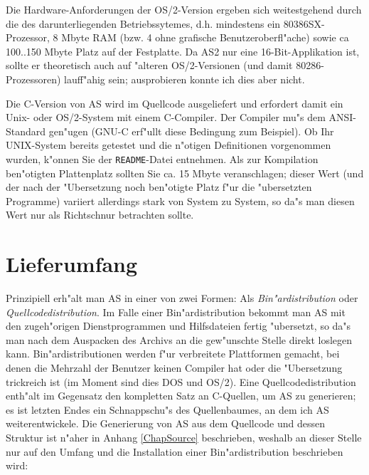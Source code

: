 \documentclass[12pt,a4paper,twoside]{report}
\newcommand{\tty}[1]{{\tt #1}}
\begin{document}
Die Hardware-Anforderungen der  OS/2-Version ergeben sich
weitestgehend durch die des darunterliegenden Betriebssytemes, d.h.
mindestens ein 80386SX-Prozessor, 8 Mbyte RAM (bzw. 4 ohne grafische
Benutzeroberfl"ache) sowie ca 100..150 Mbyte Platz auf der Festplatte.  Da
AS2 nur eine 16-Bit-Applikation ist, sollte er theoretisch auch auf
"alteren OS/2-Versionen (und damit 80286-Prozessoren) lauff"ahig sein;
ausprobieren konnte ich dies aber nicht.

Die C-Version  von AS wird im Quellcode ausgeliefert
und erfordert damit ein Unix- oder OS/2-System mit einem C-Compiler.
Der Compiler mu"s dem ANSI-Standard gen"ugen (GNU-C erf"ullt diese
Bedingung zum Beispiel).  Ob Ihr UNIX-System bereits getestet und die
n"otigen Definitionen vorgenommen wurden, k"onnen Sie der \tty{README}-Datei
entnehmen.  Als zur Kompilation ben"otigten Plattenplatz sollten Sie
ca. 15 Mbyte veranschlagen; dieser Wert (und der nach der "Ubersetzung
noch ben"otigte Platz f"ur die "ubersetzten Programme) variiert
allerdings stark von System zu System, so da"s man diesen Wert nur als
Richtschnur betrachten sollte.


\section{Lieferumfang}

Prinzipiell erh"alt man AS in einer von zwei Formen: Als {\em
Bin"ardistribution} oder {\em Quellcodedistribution}.  Im Falle einer
Bin"ardistribution bekommt man AS mit den zugeh"origen Dienstprogrammen
und Hilfsdateien fertig "ubersetzt, so da"s man nach dem Auspacken des
Archivs an die gew"unschte Stelle direkt loslegen kann.
Bin"ardistributionen werden f"ur verbreitete Plattformen gemacht, bei
denen die Mehrzahl der Benutzer keinen Compiler hat oder die "Ubersetzung
trickreich ist (im Moment sind dies DOS und OS/2).  Eine
Quellcodedistribution enth"alt im Gegensatz den kompletten Satz an
C-Quellen, um AS zu generieren; es ist letzten Endes ein Schnappschu"s
des Quellenbaumes, an dem ich AS weiterentwickele.  Die Generierung von AS
aus dem Quellcode und dessen Struktur ist n"aher in Anhang
\ref{ChapSource} beschrieben, weshalb an dieser Stelle nur auf den
Umfang und die Installation einer Bin"ardistribution beschrieben wird:
\end{document}

